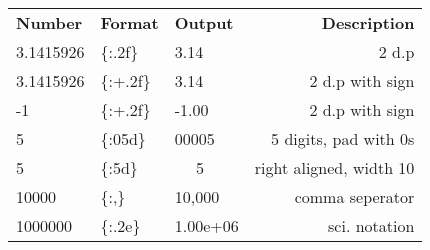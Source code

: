 \documentclass[10pt]{extarticle}
\begin{document}
\begin{multicols}{3}
\hspace*{0.3cm}

\begin{tabular}{lllr}
{\bf Number} & {\bf Format} & {\bf Output} & {\bf Description} \\
3.1415926 & \{:.2f\} & 3.14 & 2 d.p \\
3.1415926 & \{:+.2f\} & 3.14 & 2 d.p with sign \\
-1 & \{:+.2f\} & -1.00 & 2 d.p with sign \\
5 & \{:05d\} & 00005 & 5 digits, pad with 0s \\
5 & \{:5d\} & \,\,\,\,\,\,\,\,5 & right aligned, width 10 \\
10000 & \{:,\} & 10,000 & comma seperator \\
1000000 & \{:.2e\} & 1.00e+06 & sci. notation \\
\end{tabular}



\end{multicols}
\end{document}
